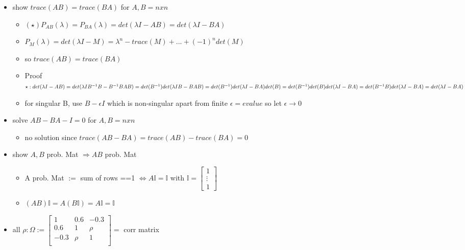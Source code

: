 \documentclass[10pt,landscape,a4paper]{article}
\begin{document}
\begin{multicols*}{4}
\begin{spacing}{0.1}
\begin{itemize}
\item \colorbox{green!10}{ show $trace(AB)=trace(BA)$ for $A,B=nxn$ }
\begin{itemize}
	\item $ (\star) P_{AB}(\lambda)=P_{BA}(\lambda)=det(\lambda I-AB)=det(\lambda I-BA)$
	\item $P_{M}(\lambda)=det(\lambda I-M)=\lambda^n - trace(M) + ... + (-1)^n det(M)$
	\item so $trace(AB)=trace(BA)$
	\item Proof $\star : \\ det(\lambda I-AB) \\= det(\lambda IB^{-1}B-B^{-1}BAB) \\=det(B^{-1}) det (\lambda IB -BAB )  \\= det(B^{-1}) det (\lambda I -BA ) det(B) \\= det(B^{-1}) det(B) det (\lambda I -BA ) \\=  det(B^{-1}B) det (\lambda I -BA ) \\= det (\lambda I -BA ) $
	\item for singular B, use $B-\epsilon I$ which is non-singular apart from finite $\epsilon=evalue$ so let  $\epsilon \rightarrow 0$
\end{itemize}

\item \colorbox{green!10}{ solve $AB-BA-I=0$ for $A,B=nxn$ }
\begin{itemize}
\item no solution since $trace(AB-BA)=trace(AB)-trace(BA)=0$
\end{itemize}

\item \colorbox{green!10}{ show $A,B$ prob. Mat $\Rightarrow AB$ prob. Mat}
\begin{itemize}
	\item A prob. Mat $:= $ sum of rows ==1 $ \Leftrightarrow A \mathbb{I}=\mathbb{I}$ with $\mathbb{I}= \begin{bmatrix} 1 \\ \vdots \\ 1 \end{bmatrix}$  
	\item $(AB)\mathbb{I}=A(B\mathbb{I})=A\mathbb{I}=\mathbb{I}$
\end{itemize}

\item \colorbox{green!10}{ all $\rho : \Omega := \begin{bmatrix} 1 & 0.6 & -0.3 \\ 0.6 & 1 & \rho \\ -0.3 & \rho & 1 \\ \end{bmatrix}=$ corr matrix }


\end{itemize}
\end{spacing}
\end{multicols*}
\end{document}

